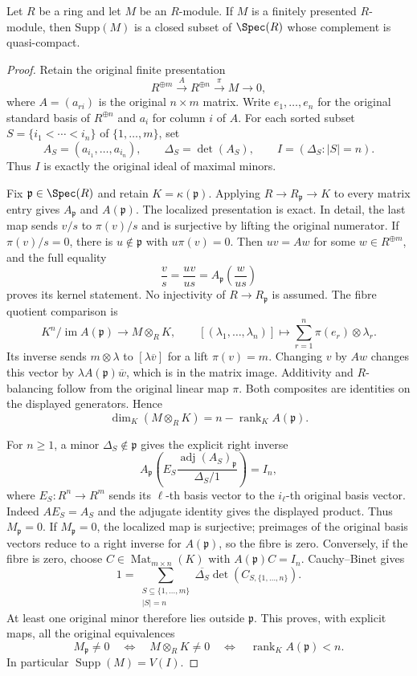 \begin{lemma}
\label{lemma-support-finite-presentation-constructible}
Let $R$ be a ring and let $M$ be an $R$-module.
If $M$ is a finitely presented $R$-module, then $\text{Supp}(M)$ is a
closed subset of $\Spec(R)$ whose complement is quasi-compact.
\end{lemma}

\begin{proof}
Retain the original finite presentation
$$
R^{\oplus m}\xrightarrow{A}R^{\oplus n}
\xrightarrow{\pi}M\longrightarrow0,
$$
where $A=(a_{ri})$ is the original $n\times m$ matrix.
Write $e_1,\ldots,e_n$ for the original standard basis
of $R^{\oplus n}$ and $a_i$ for column $i$ of $A$.
For each sorted subset $S=\{i_1<\cdots<i_n\}$ of
$\{1,\ldots,m\}$, set
$$
A_S=(a_{i_1},\ldots,a_{i_n}),\qquad
\Delta_S=\det(A_S),\qquad
I=(\Delta_S:|S|=n).
$$
Thus $I$ is exactly the original ideal of maximal minors.

Fix $\mathfrak p\in\Spec(R)$ and retain
$K=\kappa(\mathfrak p)$.
Applying $R\to R_{\mathfrak p}\to K$ to every matrix
entry gives $A_{\mathfrak p}$ and $A(\mathfrak p)$.
The localized presentation is exact. In detail, the last
map sends $v/s$ to $\pi(v)/s$ and is surjective by lifting
the original numerator. If $\pi(v)/s=0$, there is
$u\notin\mathfrak p$ with $u\pi(v)=0$. Then $uv=Aw$
for some $w\in R^{\oplus m}$, and the full equality
$$
\frac vs=\frac{uv}{us}
=A_{\mathfrak p}\left(\frac w{us}\right)
$$
proves its kernel statement. No injectivity of
$R\to R_{\mathfrak p}$ is assumed.
The fibre quotient comparison is
$$
K^n/\operatorname{im}A(\mathfrak p)
\longrightarrow M\otimes_RK,
\qquad
[(\lambda_1,\ldots,\lambda_n)]
\longmapsto\sum_{r=1}^n\pi(e_r)\otimes\lambda_r.
$$
Its inverse sends $m\otimes\lambda$ to
$[\lambda\overline v]$ for a lift $\pi(v)=m$.
Changing $v$ by $Aw$ changes this vector by
$\lambda A(\mathfrak p)\overline w$, which is in the
matrix image. Additivity and $R$-balancing follow from
the original linear map $\pi$. Both composites are
identities on the displayed generators. Hence
$$
\dim_K(M\otimes_RK)=n-\operatorname{rank}_K A(\mathfrak p).
$$

For $n\geq1$, a minor $\Delta_S\notin\mathfrak p$
gives the explicit right inverse
$$
A_{\mathfrak p}
\left(E_S\frac{\operatorname{adj}(A_S)_{\mathfrak p}}
{\Delta_S/1}\right)=I_n,
$$
where $E_S:R^n\to R^m$ sends its $\ell$-th basis
vector to the $i_\ell$-th original basis vector.
Indeed $AE_S=A_S$ and the adjugate identity gives the
displayed product. Thus $M_{\mathfrak p}=0$.
If $M_{\mathfrak p}=0$, the localized map is surjective;
preimages of the original basis vectors reduce to a
right inverse for $A(\mathfrak p)$, so the fibre is zero.
Conversely, if the fibre is zero, choose
$C\in\operatorname{Mat}_{m\times n}(K)$ with
$A(\mathfrak p)C=I_n$. Cauchy--Binet gives
$$
1=\sum_{\substack{S\subseteq\{1,\ldots,m\}\\|S|=n}}
\overline{\Delta_S}\det(C_{S,\{1,\ldots,n\}}).
$$
At least one original minor therefore lies outside
$\mathfrak p$. This proves, with explicit maps, all
the original equivalences
$$
M_{\mathfrak p}\ne0
\quad\Longleftrightarrow\quad
M\otimes_RK\ne0
\quad\Longleftrightarrow\quad
\operatorname{rank}_K A(\mathfrak p)<n.
$$
In particular $\operatorname{Supp}(M)=V(I)$.


\end{proof}
